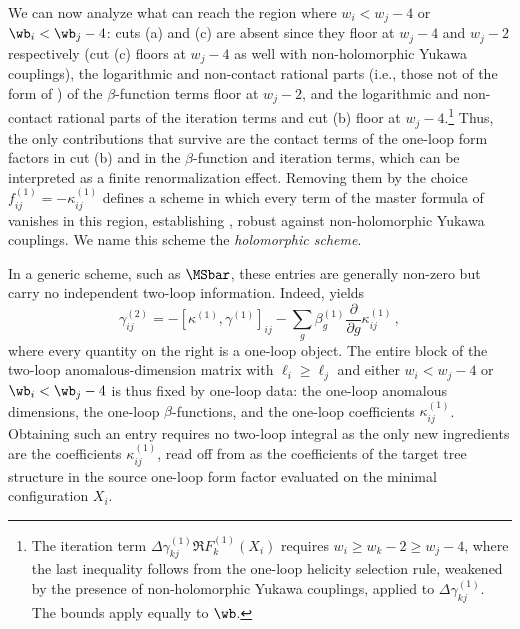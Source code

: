 We can now analyze what can reach the region where $w_i < w_j - 4$ or $\wb_i < \wb_j - 4$: cuts (a)
and (c) are absent since they floor at $w_j - 4$ and $w_j-2$ respectively (cut (c) floors at $w_j - 4$ as well with non-holomorphic Yukawa couplings), 
the logarithmic and non-contact rational parts (i.e., those not of the form of ) of
the $\beta$-function terms floor at $w_j - 2$, and the logarithmic and
non-contact rational parts of the iteration terms and cut (b) floor at $w_j - 4$.\footnote{The iteration term $\Delta\gamma^{(1)}_{kj}\Re F^{(1)}_k(X_i)$ requires $w_i \ge w_k - 2 \ge w_j - 4$, where the last inequality follows from the one-loop helicity selection rule, weakened by the presence of non-holomorphic Yukawa couplings, applied to $\Delta\gamma^{(1)}_{kj}$. The bounds apply equally to $\wb$.}
Thus, the only contributions that survive are
the contact terms of the one-loop form factors in cut (b)
and in the $\beta$-function and iteration terms, which can be interpreted as a finite renormalization effect.
Removing them by the choice $f^{(1)}_{ij} = - \kappa^{(1)}_{ij}$ defines a scheme
in which every term of the master formula of  vanishes in this region, establishing
, robust against non-holomorphic Yukawa couplings.
We name this scheme the \textit{holomorphic scheme}.

In a generic scheme, such as $\MSbar$, these entries are generally non-zero but carry no independent
two-loop information. Indeed,  yields
\begin{equation}
\label{eq:onedet}
    \gamma^{(2)}_{ij} = -[\kappa^{(1)},\gamma^{(1)}]_{ij} - \sum_g\beta_g^{(1)}\frac{\partial}{\partial g} \kappa^{(1)}_{ij} \,,
\end{equation}
where every quantity on the right is a one-loop object.
The entire block of the two-loop anomalous-dimension matrix with $\ell_i \ge \ell_j$ and either $w_i < w_j - 4$ or
$\wb_i < \wb_j - 4$ is thus fixed by one-loop data: the one-loop anomalous dimensions, the
one-loop $\beta$-functions, and the one-loop coefficients $\kappa^{(1)}_{ij}$.
Obtaining such an entry requires no two-loop integral as the only new ingredients are the
coefficients $\kappa^{(1)}_{ij}$, 
read off from  as the coefficients of the target tree structure in the source one-loop form factor evaluated on the minimal configuration $X_i$.

